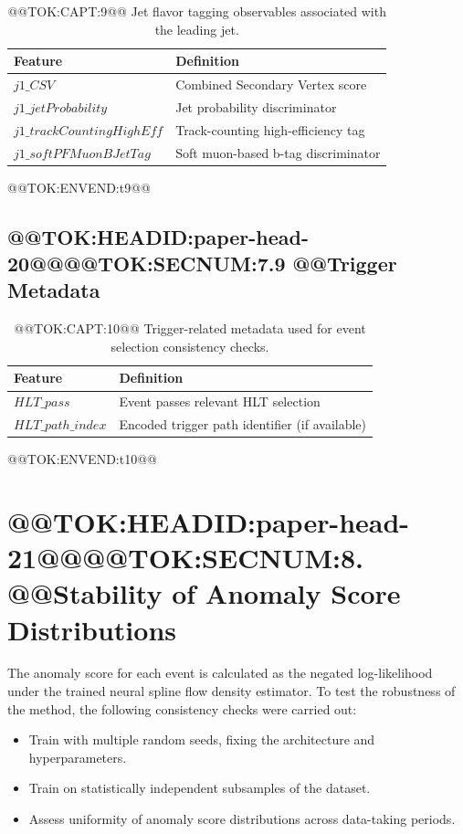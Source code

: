 \documentclass[11pt]{article}
\begin{document}
\begin{table}[H]
\centering
\caption{@@TOK:CAPT:9@@ Jet flavor tagging observables associated with the leading jet.}
\footnotesize

\begin{tabular}{ll}
\toprule
Feature & Definition \\
\midrule
$j1\_CSV$ & Combined Secondary Vertex score \\
$j1\_jetProbability$ & Jet probability discriminator \\
$j1\_trackCountingHighEff$ & Track-counting high-efficiency tag \\
$j1\_softPFMuonBJetTag$ & Soft muon-based b-tag discriminator \\
\bottomrule
\end{tabular}

@@TOK:ENVEND:t9@@\end{table}

\subsection{@@TOK:HEADID:paper-head-20@@@@TOK:SECNUM:7.9 @@Trigger Metadata}

\begin{table}[h]
\centering
\caption{@@TOK:CAPT:10@@ Trigger-related metadata used for event selection consistency checks.}
\footnotesize

\begin{tabular}{ll}
\toprule
Feature & Definition \\
\midrule
$HLT\_pass$ & Event passes relevant HLT selection \\
$HLT\_path\_index$ & Encoded trigger path identifier (if available) \\
\bottomrule
\end{tabular}

@@TOK:ENVEND:t10@@\end{table}

\section{@@TOK:HEADID:paper-head-21@@@@TOK:SECNUM:8. @@Stability of Anomaly Score Distributions}

The anomaly score for each event is calculated as the negated log-likelihood under the trained neural spline flow density estimator. To test the robustness of the method, the following consistency checks were carried out:

\begin{itemize}
  \item Train with multiple random seeds, fixing the architecture and hyperparameters.
  \item Train on statistically independent subsamples of the dataset.
  \item Assess uniformity of anomaly score distributions across data-taking periods.
\end{itemize}
\end{document}
